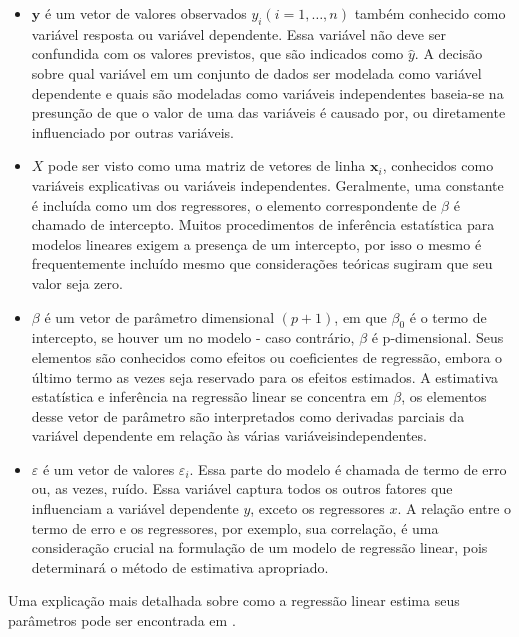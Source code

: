 \begin{itemize}
	\item $ \mathbf {y} $ é um vetor de valores observados $ y_{i} (i = 1, \ldots, n) $ também conhecido como variável resposta ou variável dependente. Essa variável não deve ser confundida com os valores previstos, que são indicados como $ \hat{y} $. A decisão sobre qual variável em um conjunto de dados ser modelada como variável dependente e quais são modeladas como variáveis ​​independentes baseia-se na presunção de que o valor de uma das variáveis ​​é causado por, ou diretamente influenciado por outras variáveis.

	\item $ X $ pode ser visto como uma matriz de vetores de linha $ \mathbf {x}_{i} $, conhecidos como variáveis ​​explicativas ou variáveis ​​independentes. Geralmente, uma constante é incluída como um dos regressores, o elemento correspondente de $ \beta $ é chamado de intercepto. Muitos procedimentos de inferência estatística para modelos lineares exigem a presença de um intercepto, por isso o mesmo é frequentemente incluído mesmo que considerações teóricas sugiram que seu valor seja zero.

	\item $ \beta $ é um vetor de parâmetro dimensional $ (p + 1) $, em que $ \beta_{0} $ é o termo de intercepto, se houver um no modelo - caso contrário, $ \beta $ é p-dimensional. Seus elementos são conhecidos como efeitos ou coeficientes de regressão, embora o último termo as vezes seja reservado para os efeitos estimados. A estimativa estatística e inferência na regressão linear se concentra em $ \beta $, os elementos desse vetor de parâmetro são interpretados como derivadas parciais da variável dependente em relação às várias variáveis ​​independentes.

	\item $ \varepsilon $ é um vetor de valores $ \varepsilon_{i} $. Essa parte do modelo é chamada de termo de erro ou, as vezes, ruído. Essa variável captura todos os outros fatores que influenciam a variável dependente $ y $, exceto os regressores $ x $. A relação entre o termo de erro e os regressores, por exemplo, sua correlação, é uma consideração crucial na formulação de um modelo de regressão linear, pois determinará o método de estimativa apropriado.
\end{itemize}

Uma explicação mais detalhada sobre como a regressão linear estima seus parâmetros pode ser encontrada em \citet{Freedman2009}.

